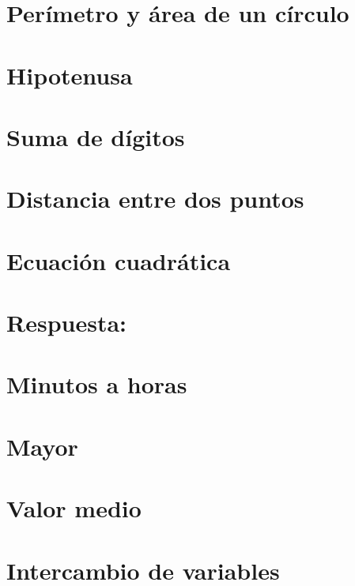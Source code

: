 \section{Perímetro y área de un círculo}


\section{Hipotenusa}


\section{Suma de dígitos}


\section{Distancia entre dos puntos}


\section{Ecuación cuadrática}

\ifshowanswers
\section*{Respuesta:}

\fi

\section{Minutos a horas}


\section{Mayor}


\section{Valor medio}

    
\section{Intercambio de variables}

\ifshowanswers
